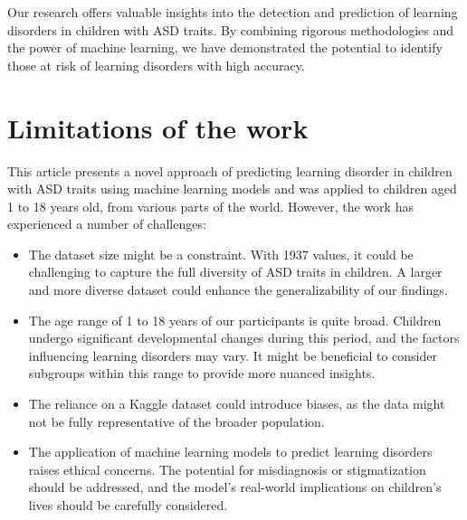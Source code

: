 \documentclass{article}
\begin{document}
\begin{multicols}{2}
\hspace*{\parindent} Our research offers valuable insights into the detection and prediction of learning disorders in children with ASD traits. By combining rigorous methodologies and the power of machine learning, we have demonstrated the potential to identify those at risk of learning disorders with high accuracy.\\




\section{Limitations of the work}
\hspace*{\parindent}This article presents a novel approach of predicting learning disorder in children with ASD traits using machine learning models and was applied to children aged 1 to 18 years old, from various parts of the world. However, the work has experienced a number of challenges:
\begin{itemize}
    \item The dataset size might be a constraint. With 1937 values, it could be challenging to capture the full diversity of ASD traits in children. A larger and more diverse dataset could enhance the generalizability of our findings.
    \item The age range of 1 to 18 years of our participants is quite broad. Children undergo significant developmental changes during this period, and the factors influencing learning disorders may vary. It might be beneficial to consider subgroups within this range to provide more nuanced insights.
    \item The reliance on a Kaggle dataset could introduce biases, as the data might not be fully representative of the broader population. 
    \item The application of machine learning models to predict learning disorders raises ethical concerns. The potential for misdiagnosis or stigmatization should be addressed, and the model's real-world implications on children's lives should be carefully considered.
\end{itemize}


\end{multicols}
\end{document}
